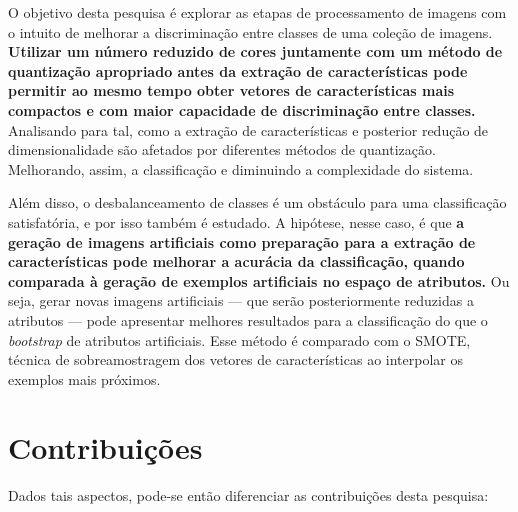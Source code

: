O objetivo desta pesquisa é explorar as etapas de processamento de imagens com o intuito de melhorar a discriminação entre classes de uma coleção de imagens. \textbf{Utilizar um número reduzido de cores juntamente com um método de quantização apropriado antes da extração de características pode permitir ao mesmo tempo obter vetores de características mais compactos e com maior capacidade de discriminação entre classes.} Analisando para tal, como a extração de características e posterior redução de dimensionalidade são afetados por diferentes métodos de quantização. Melhorando, assim, a classificação e diminuindo a complexidade do sistema.

Além disso, o desbalanceamento de classes é um obstáculo para uma classificação satisfatória, e por isso também é estudado. A hipótese, nesse caso, é que \textbf{a geração de imagens artificiais como preparação para a extração de características pode melhorar a acurácia da classificação, quando comparada à geração de exemplos artificiais no espaço de atributos.} Ou seja, gerar novas imagens artificiais — que serão posteriormente reduzidas a atributos — pode apresentar melhores resultados para a classificação do que o \textit{bootstrap} de atributos artificiais. Esse método é comparado com o SMOTE, técnica de sobreamostragem dos vetores de características ao interpolar os exemplos mais próximos.

\section{Contribuições}

Dados tais aspectos, pode-se então diferenciar as contribuições desta pesquisa:

